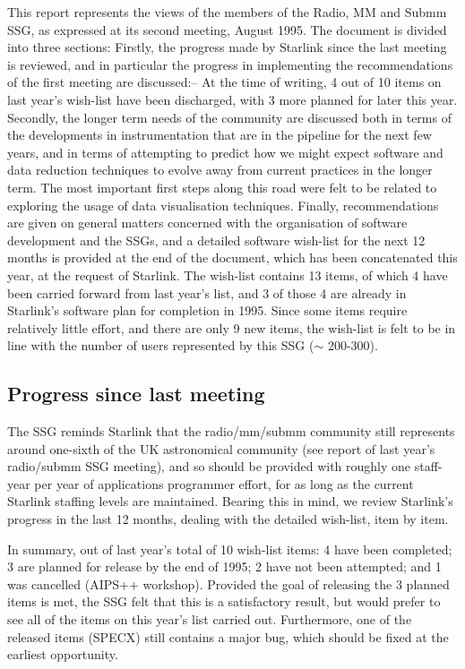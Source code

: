 This report represents the views of the members of the Radio, MM and
Submm SSG, as expressed at its second meeting, August 1995. The
document is divided into three sections: Firstly, the progress made by
Starlink since the last meeting is reviewed, and in particular the
progress in implementing the recommendations of the first meeting are
discussed:-- At the time of writing, 4 out of 10 items on last year's
wish-list have been discharged, with 3 more planned for later this
year. Secondly, the longer term needs of the community are discussed
both in terms of the developments in instrumentation that are in the
pipeline for the next few years, and in terms of attempting to predict
how we might expect software and data reduction techniques to evolve
away from current practices in the longer term. The most important
first steps along this road were felt to be related to exploring the
usage of data visualisation techniques. Finally, recommendations are
given on general matters concerned with the organisation of software
development and the SSGs, and a detailed software wish-list for the
next 12 months is provided at the end of the document, which has been
concatenated this year, at the request of Starlink. The wish-list
contains 13 items, of which 4 have been carried forward from last
year's list, and 3 of those 4 are already in Starlink's software plan
for completion in 1995. Since some items require relatively little
effort, and there are only 9 new items, the wish-list is felt to be in
line with the number of users represented by this SSG ($\sim$
200-300).

\subsection{Progress since last meeting}

The SSG reminds Starlink that the radio/mm/submm community still
represents around one-sixth of the UK astronomical community (see
report of last year's radio/submm SSG meeting), and so should be
provided with roughly one staff-year per year of applications
programmer effort, for as long as the current Starlink staffing levels
are maintained. Bearing this in mind, we review Starlink's progress in
the last 12 months, dealing with the detailed wish-list, item by item.

In summary, out of last year's total of 10 wish-list items: 4 have
been completed; 3 are planned for release by the end of 1995; 2 have
not been attempted; and 1 was cancelled (AIPS++ workshop). Provided
the goal of releasing the 3 planned items is met, the SSG felt that
this is a satisfactory result, but would prefer to see all of the
items on this year's list carried out. Furthermore, one of the
released items (SPECX) still contains a major bug, which should be
fixed at the earliest opportunity.

